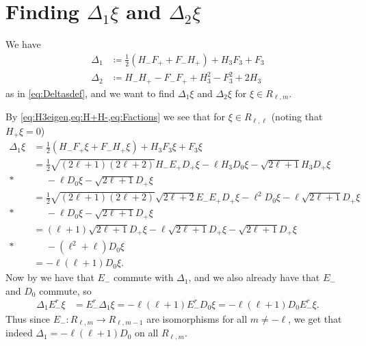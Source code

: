 \section{\texorpdfstring{Finding $\Delta_1 \xi$ and $\Delta_2 \xi$}{Finding Delta\_1 xi and Delta\_2 xi}}\label{sec:Deltacalc}

We have
\begin{align*}
  \Delta_1 &\coloneqq \tfrac{1}{2}(H_-F_++F_-H_+) + H_3F_3 + F_3 \\
  \Delta_2 &\coloneqq H_-H_+ - F_-F_+ + H_3^2 - F_3^2 + 2H_3
\end{align*}
as in \cref{eq:Deltasdef}, and we want to find $\Delta_1\xi$ and $\Delta_2 \xi$ for $\xi\in R_{\ell,m}$.

By \cref{eq:H3eigen,eq:H+H-,eq:Factions} we see that for $\xi\in R_{\ell,\ell}$ (noting that $H_+\xi=0$)
\begin{align*}
  \Delta_1 \xi &= \tfrac{1}{2}(H_-F_+\xi+F_-H_+\xi) + H_3F_3\xi + F_3\xi \\
        &= \tfrac{1}{2}\sqrt{(2\ell+1)(2\ell+2)}H_-E_+D_+\xi - \ell H_3D_0\xi  - \sqrt{2\ell+1}H_3D_+\xi \\*
        &\phantom{{}={}}{} - \ell D_0\xi - \sqrt{2\ell+1}D_+\xi \\
        &= \tfrac{1}{2}\sqrt{(2\ell+1)(2\ell+2)}\sqrt{2\ell+2}E_-E_+D_+\xi - \ell^2D_0\xi - \ell\sqrt{2\ell+1}D_+\xi \\*
        &\phantom{{}={}}{} - \ell D_0\xi - \sqrt{2\ell+1}D_+\xi \\
        &= (\ell+1)\sqrt{2\ell+1}D_+\xi - \ell\sqrt{2\ell+1}D_+\xi - \sqrt{2\ell+1}D_+\xi \\*
        &\phantom{{}={}}{} -(\ell^2+\ell)D_0\xi \\
        &= -\ell(\ell+1)D_0\xi.
\end{align*}
Now by  we have that $E_-$ commute with $\Delta_1$, and we also already have that $E_-$ and $D_0$ commute, so
\begin{align*}
  \Delta_1E_-^r \xi &= E_-^r \Delta_1 \xi = -\ell(\ell+1)E_-^rD_0 \xi = -\ell(\ell+1)D_0E_-^r \xi.
\end{align*}
Thus since $E_- \colon R_{\ell,m}\to R_{\ell,m-1}$ are isomorphisms for all $m\neq -\ell$, we get that indeed $\Delta_1 = -\ell(\ell+1)D_0$ on all $R_{\ell,m}$. 

